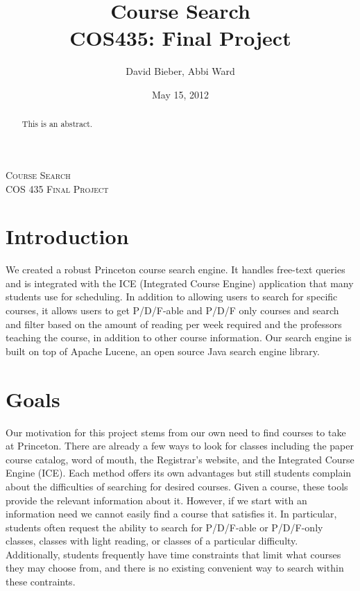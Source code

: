 \documentclass[12pt,letterpaper]{article}
\begin{document}
\title{Course Search \\ \large{COS435: Final Project}}
\author{David Bieber, Abbi Ward}
\date{May 15, 2012}

\begin{titlepage}
\begin{center}
\textsc{\LARGE Course Search}\\[1.5cm]
\textsc{\Large COS 435 Final Project}\\[.5cm]
\end{center}
\maketitle
\end{titlepage}


\begin{abstract}
This is an abstract.
\end{abstract}

\section{Introduction}
We created a robust Princeton course search engine. It handles free-text queries and is integrated with the ICE (Integrated Course Engine) application that many students use for scheduling. In addition to allowing users to search for specific courses, it allows users to get P/D/F-able and P/D/F only courses and search and filter based on the amount of reading per week required and the professors teaching the course, in addition to other course information. Our search engine is built on top of Apache Lucene, an open source Java search engine library.


\section{Goals}
Our motivation for this project stems from our own need to find courses to take at Princeton. There are already a few ways to look for classes including the paper course catalog, word of mouth, the Registrar's website, and the Integrated Course Engine (ICE). Each method offers its own advantages but still students complain about the difficulties of searching for desired courses. Given a course, these tools provide the relevant information about it. However, if we start with an information need we cannot easily find a course that satisfies it. In particular, students often request the ability to search for P/D/F-able or P/D/F-only classes, classes with light reading, or classes of a particular difficulty. Additionally, students frequently have time constraints that limit what courses they may choose from, and there is no existing convenient way to search within these contraints.
	
\end{document}
